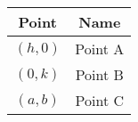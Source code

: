 \begin{tabular}{|c|c|}
        \hline
        \textbf{Point} & \textbf{Name} \\ \hline
        $(h,0)$       & Point A \\ \hline
        $(0,k)$       & Point B \\ \hline
        $(a,b)$       & Point C \\ \hline
    \end{tabular}